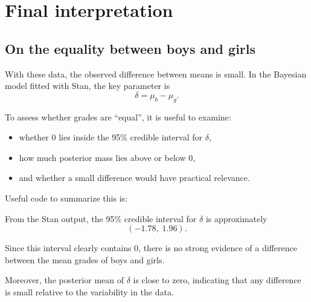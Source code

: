 \documentclass[
  english,
  12pt,
]{article}
\newenvironment{Shaded}{\begin{snugshade}}{\end{snugshade}}
\newcommand{\AttributeTok}[1]{\textcolor[rgb]{0.13,0.29,0.53}{#1}}
\newcommand{\DecValTok}[1]{\textcolor[rgb]{0.00,0.00,0.81}{#1}}
\newcommand{\FloatTok}[1]{\textcolor[rgb]{0.00,0.00,0.81}{#1}}
\newcommand{\FunctionTok}[1]{\textcolor[rgb]{0.13,0.29,0.53}{\textbf{#1}}}
\newcommand{\NormalTok}[1]{#1}
\newcommand{\OtherTok}[1]{\textcolor[rgb]{0.56,0.35,0.01}{#1}}
\newcommand{\SpecialCharTok}[1]{\textcolor[rgb]{0.81,0.36,0.00}{\textbf{#1}}}
\providecommand{\tightlist}{%
  \setlength{\itemsep}{0pt}\setlength{\parskip}{0pt}}
\begin{document}
\section{Final interpretation}\label{final-interpretation}

\subsection{On the equality between boys and
girls}\label{on-the-equality-between-boys-and-girls}

With these data, the observed difference between means is small. In the
Bayesian model fitted with Stan, the key parameter is \[
\delta = \mu_b - \mu_g.
\]

To assess whether grades are ``equal'', it is useful to examine:

\begin{itemize}
\tightlist
\item
  whether 0 lies inside the 95\% credible interval for \(\delta\),
\item
  how much posterior mass lies above or below 0,
\item
  and whether a small difference would have practical relevance.
\end{itemize}

Useful code to summarize this is:

\begin{Shaded}
\end{Shaded}

From the Stan output, the 95\% credible interval for \(\delta\) is
approximately \[
(-1.78,\; 1.96).
\]

Since this interval clearly contains 0, there is no strong evidence of a
difference between the mean grades of boys and girls.

Moreover, the posterior mean of \(\delta\) is close to zero, indicating
that any difference is small relative to the variability in the data.
\end{document}
